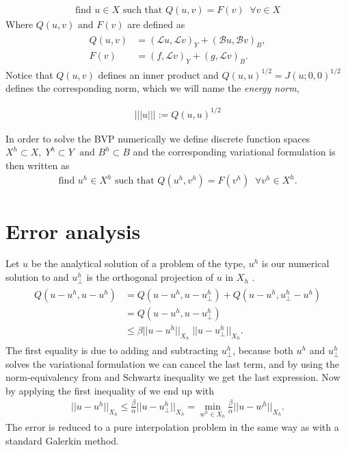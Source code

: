 \begin{align}
	\text{find } u \in X \text{  such that  } Q(u,v) = F(v) \; \; \forall v\in X
	\label{eq:varFormGen}
\end{align}
Where $Q(u,v)$ and $F(v)$ are defined as 
\begin{align}
	\begin{split}
	Q(u,v) &= (\mathcal{L}u,\mathcal{L}v)_Y+(\mathcal{B}u,\mathcal{B}v)_B, \\
	F(v) &= (f,\mathcal{L}v)_Y+(g,\mathcal{L}v)_B.
	\end{split}
	\label{eq:VarFormLinForms}
\end{align}
%
Notice that $Q(u,v)$ defines an inner product and $Q(u,u)^{1/2}=J(u;0,0)^{1/2}$ defines the corresponding norm, which we will name the \textit{energy norm},

\begin{align}
	||| u ||| := Q(u,u)^{1/2}
	\label{eq:energynorm}
\end{align}

In order to solve the BVP numerically we define discrete function spaces $X^h \subset X, \; Y^h\subset Y \; \text{ and } B^h \subset B $ and the corresponding variational formulation is then written as 
\begin{align}
	\text{find } u^h \in X^h \text{  such that  } Q(u^h,v^h) = F(v^h) \; \; \forall v^h\in X^h.
	\label{eq:varFormGenDisc}
\end{align}
%
\section{Error analysis}
Let $u$ be the analytical solution of a problem of the type, $u^h$ is our numerical solution to and $u^h_{\perp} $ is the orthogonal projection of $u$ in $X_h$ \cite{bochev1998}. 
\begin{align}
	\begin{split}
	Q(u-u^h,u-u^h) &= Q(u-u^h,u-u^h_{\perp}) + Q(u-u^h,u^h_{\perp}-u^h) \\
							   &= Q(u-u^h,u-u^h_{\perp}) \\
							 	 &\leq \beta ||u-u^h||_{X_h} \; ||u-u^h_{\perp}||_{X_h}.
	\end{split}
	\label{eq:error1}
\end{align}
The first equality is due to adding and subtracting $u^h_{\perp}$, because both $u^h$ and $u^h_{\perp}$ solves the variational formulation we can cancel the last term, and by using the norm-equivalency from and Schwartz inequality we get the last  expression. Now by applying the first inequality of we end up with 
\begin{align}
	||u-u^h||_{X_h}\leq \frac{\beta}{\alpha}||u-u^h_{\perp}||_{X_h} = \min_{w^h \in X_h}\frac{\beta}{\alpha}||u-w^h||_{X_h}.
	\label{error_final}
\end{align}
The error is reduced to a pure interpolation problem in the same way as with a standard Galerkin method. 

